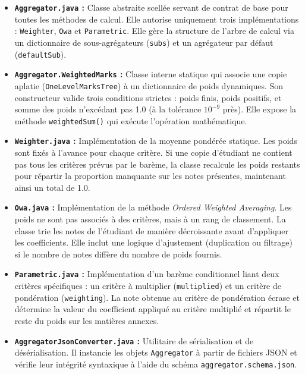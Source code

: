 \documentclass[11pt, a4paper]{article}
\begin{document}
\begin{itemize}
    \item \textbf{\texttt{Aggregator.java} :} Classe abstraite scellée servant de contrat de base pour toutes les méthodes de calcul. Elle autorise uniquement trois implémentations : \texttt{Weighter}, \texttt{Owa} et \texttt{Parametric}. Elle gère la structure de l'arbre de calcul via un dictionnaire de sous-agrégateurs (\texttt{subs}) et un agrégateur par défaut (\texttt{defaultSub}).
    
    \item \textbf{\texttt{Aggregator.WeightedMarks} :} Classe interne statique qui associe une copie aplatie (\texttt{OneLevelMarksTree}) à un dictionnaire de poids dynamiques. Son constructeur valide trois conditions strictes : poids finis, poids positifs, et somme des poids n'excédant pas 1.0 (à la tolérance $10^{-9}$ près). Elle expose la méthode \texttt{weightedSum()} qui exécute l'opération mathématique.

    \item \textbf{\texttt{Weighter.java} :} Implémentation de la moyenne pondérée statique. Les poids sont fixés à l'avance pour chaque critère. Si une copie d'étudiant ne contient pas tous les critères prévus par le barème, la classe recalcule les poids restants pour répartir la proportion manquante sur les notes présentes, maintenant ainsi un total de 1.0.

    \item \textbf{\texttt{Owa.java} :} Implémentation de la méthode \textit{Ordered Weighted Averaging}. Les poids ne sont pas associés à des critères, mais à un rang de classement. La classe trie les notes de l'étudiant de manière décroissante avant d'appliquer les coefficients. Elle inclut une logique d'ajustement (duplication ou filtrage) si le nombre de notes diffère du nombre de poids fournis.

    \item \textbf{\texttt{Parametric.java} :} Implémentation d'un barème conditionnel liant deux critères spécifiques : un critère à multiplier (\texttt{multiplied}) et un critère de pondération (\texttt{weighting}). La note obtenue au critère de pondération écrase et détermine la valeur du coefficient appliqué au critère multiplié et répartit le reste du poids sur les matières annexes.

    \item \textbf{\texttt{AggregatorJsonConverter.java} :} Utilitaire de sérialisation et de désérialisation. Il instancie les objets \texttt{Aggregator} à partir de fichiers JSON et vérifie leur intégrité syntaxique à l'aide du schéma \texttt{aggregator.schema.json}.
\end{itemize}
\end{document}
